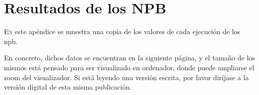 \chapter{Resultados de los NPB}
\label{chap:bench_values}

\lettrine{E}{n} este apéndice se muestra una copia de los valores de cada ejecución de los \acrlong{npb}.

En concreto, dichos datos se encuentran en la siguiente página, y el tamaño de los mismos está pensado para ser visualizado en ordenador, donde puede ampliarse el zoom del visualizador. Si está leyendo una versión escrita, por favor diríjase a la versión digital de esta misma publicación.

